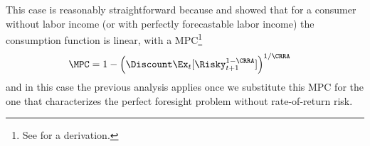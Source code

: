 This case is reasonably straightforward because \cite{merton:restat} and \cite{samuelson:portfolio} showed
that for a consumer without labor income (or with perfectly forecastable labor income) the consumption
function is linear, with a MPC\footnote{See  for a derivation.}
\begin{equation}\begin{gathered}\begin{aligned}
  \MPC  & = 1- \left(\Discount  \Ex_{t}[\Risky_{t+1}^{1-\CRRA}]\right)^{1/\CRRA} \label{eq:MPCExact}
\end{aligned}\end{gathered}\end{equation}
and in this case the previous analysis applies once we substitute this MPC for the one that characterizes
the perfect foresight problem without rate-of-return risk.
